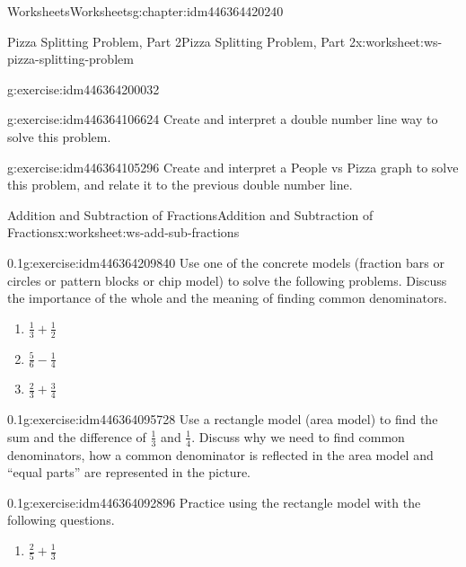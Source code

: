 \documentclass[twoside,11pt,]{book}
\begin{document}
\begin{chapterptx}{Worksheets}{}{Worksheets}{}{}{g:chapter:idm446364420240}
\begin{worksheet-section-numberless}{Pizza Splitting Problem, Part 2}{}{Pizza Splitting Problem, Part 2}{}{}{x:worksheet:ws-pizza-splitting-problem}
\begin{divisionexercise}{4}{}{}{g:exercise:idm446364200032}
\end{divisionexercise}%
\begin{divisionexercise}{5}{}{}{g:exercise:idm446364106624}%
Create and interpret a double number line way to solve this problem.%
\end{divisionexercise}%
\begin{divisionexercise}{6}{}{}{g:exercise:idm446364105296}%
Create and interpret a People vs Pizza graph to solve this problem, and relate it to the previous double number line.%
\end{divisionexercise}%
\end{worksheet-section-numberless}
\restoregeometry
%
%
\typeout{************************************************}
\typeout{************************************************}
%
\begin{worksheet-section-numberless}{Addition and Subtraction of Fractions}{}{Addition and Subtraction of Fractions}{}{}{x:worksheet:ws-add-sub-fractions}
\begin{divisionexercise}{1}{}{0.1}{g:exercise:idm446364209840}%
Use one of the concrete models (fraction bars or circles or pattern blocks or chip model) to solve the following problems. Discuss the importance of the whole and the meaning of finding common denominators.%
%
\begin{enumerate}[label=(\alph*)]
\item{}\(\frac{1}{3} + \frac{1}{2} \)%
\item{}\(\frac{5}{6} - \frac{1}{4} \)%
\item{}\(\frac{2}{3} + \frac{3}{4} \)%
\end{enumerate}
\end{divisionexercise}%
\begin{divisionexercise}{2}{}{0.1}{g:exercise:idm446364095728}%
Use a rectangle model (area model) to find the sum and the difference of \(\frac{1}{3} \) and \(\frac{1}{4} \).  Discuss why we need to find common denominators, how a common denominator is reflected in the area model and “equal parts” are represented in the picture.%
\end{divisionexercise}%
\clearpage
\begin{divisionexercise}{3}{}{0.1}{g:exercise:idm446364092896}%
Practice using the rectangle model with the following questions.%
%
\begin{enumerate}[label=(\alph*)]
\item{}\(\frac{2}{5} + \frac{1}{3} \)%

\end{enumerate}
\end{divisionexercise}
\end{worksheet-section-numberless}
\end{chapterptx}
\end{document}

